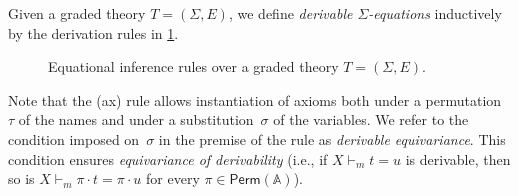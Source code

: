 \documentclass[a4paper,UKenglish,cleveref,thm-restate,numberwithinsect,final]{lipics-v2021}
\newcommand{\Perm}{\mathsf{Perm}(\Names)}
\newcommand{\sigf}{\Sigma_{\mathsf f}}
\newcommand{\sigb}{\Sigma_{\mathsf b}}
\newcommand{\Names}{\mathbb{A}}
\newcommand{\fresh}{\mathbin{\#}}
\theoremstyle{plain}
\numberwithin{equation}{section}
\newcommand{\lrule}[3]{(\text{#1})\;\frac{#2}{#3}}
\newcommand{\+}[1]{\mathcal{#1}\xspace}
\theoremstyle{definition}
\begin{document}
\noindent Given a graded theory \(T = (\Sigma, E)\), we define
\emph{derivable $\Sigma$-equations} inductively by the derivation
rules in \cref{fig:derivationrules}.
\begin{figure}
    \begin{framed}
    \end{framed}
    \caption{Equational inference rules over a graded theory \(T = (\Sigma, E)\).}
    \label{fig:derivationrules}
\end{figure}
Note that the (ax) rule allows instantiation of axioms both under a
permutation~$\tau$ of the names and under a substitution~$\sigma$ of
the variables. We refer to the condition imposed on~$\sigma$ in the
premise of the rule as \emph{derivable equivariance}. This condition
ensures \emph{equivariance of derivability} (i.e., if
$X \vdash_m t =u$ is derivable, then so is
$X \vdash_m \pi \cdot t = \pi \cdot u$ for every $\pi \in \Perm$).
\end{document}
